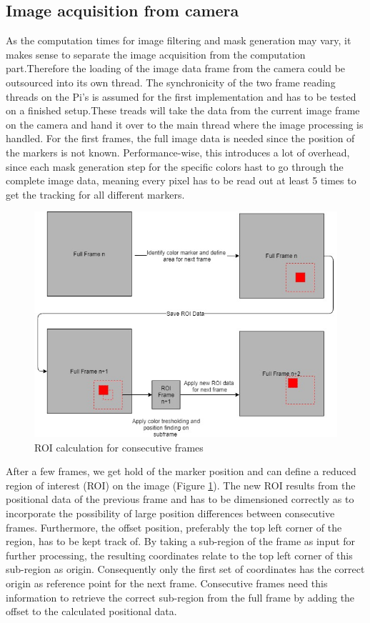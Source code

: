 \subsection{Image acquisition from camera}
As the computation times for image filtering and mask generation may vary, it makes sense to separate the image acquisition from the computation part.Therefore the loading of the image data frame from the camera could be outsourced into its own thread. The synchronicity of the two frame reading threads on the Pi's is assumed for the first implementation and has to be tested on a finished setup.These treads will take the data from the current image frame on the camera and hand it over to the main thread where the image processing is handled. For the first frames, the full image data is needed since the position of the markers is not known. Performance-wise, this introduces a lot of overhead, since each mask generation step for the specific colors hast to go through the complete image data, meaning every pixel has to be read out at least 5 times to get the tracking for all different markers.
\begin{figure}[H]
\includegraphics[width=\textwidth]{images/ROI.jpg}
\caption{ROI calculation for consecutive frames}
\label{roi_calc} 
\end{figure}
After a few frames, we get hold of the marker position and can define a reduced region of interest (ROI) on the image (Figure \ref{roi_calc}). The new ROI results from the positional data of the previous frame and has to be dimensioned correctly as to incorporate the possibility of large position differences between consecutive frames.
Furthermore, the offset position, preferably the top left corner of the region, has to be kept track of. By taking a sub-region of the frame as input for further processing, the resulting coordinates relate to the top left corner of this sub-region as origin. Consequently only the first set of coordinates has the correct origin as reference point for the next frame. Consecutive frames need this information to retrieve the correct sub-region from the full frame by adding the offset to the calculated positional data.
